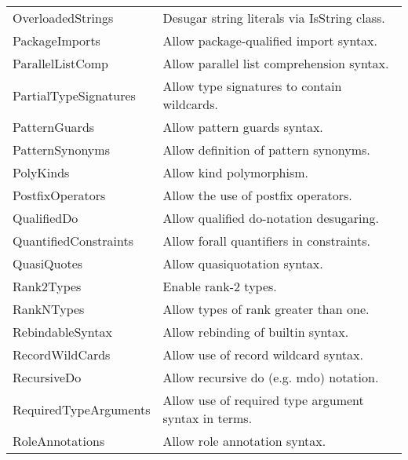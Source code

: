 \documentclass[openany, 12pt]{book}
\begin{document}
\begin{center}
\begin{supertabular}{ll}
		OverloadedStrings          & Desugar string literals via IsString class.                                \\
		PackageImports             & Allow package-qualified import syntax.                                     \\
		ParallelListComp           & Allow parallel list comprehension syntax.                                  \\
		PartialTypeSignatures      & Allow type signatures to contain wildcards.                                \\
		PatternGuards              & Allow pattern guards syntax.                                               \\
		PatternSynonyms            & Allow definition of pattern synonyms.                                      \\
		PolyKinds                  & Allow kind polymorphism.                                                   \\
		PostfixOperators           & Allow the use of postfix operators.                                        \\
		QualifiedDo                & Allow qualified do-notation desugaring.                                    \\
		QuantifiedConstraints      & Allow forall quantifiers in constraints.                                   \\
		QuasiQuotes                & Allow quasiquotation syntax.                                               \\
		Rank2Types                 & Enable rank-2 types.                                                       \\
		RankNTypes                 & Allow types of rank greater than one.                                      \\
		RebindableSyntax           & Allow rebinding of builtin syntax.                                         \\
		RecordWildCards            & Allow use of record wildcard syntax.                                       \\
		RecursiveDo                & Allow recursive do (e.g. mdo) notation.                                    \\
		RequiredTypeArguments      & Allow use of required type argument syntax in terms.                       \\
		RoleAnnotations            & Allow role annotation syntax.                                              \\

\end{supertabular}
\end{center}
\end{document}
